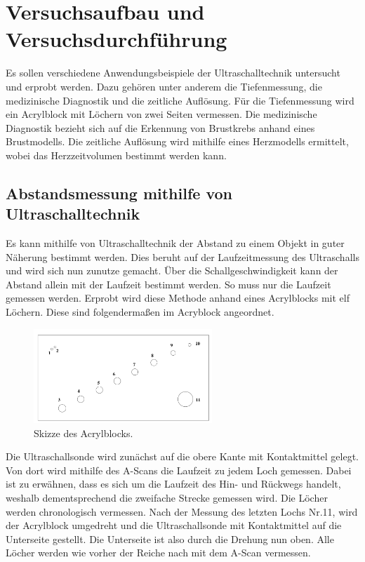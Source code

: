 


\section{Versuchsaufbau und Versuchsdurchführung}
\label{sec:Durchfuehrung}

Es sollen verschiedene Anwendungsbeispiele der Ultraschalltechnik untersucht und erprobt werden.
Dazu gehören unter anderem die Tiefenmessung, die medizinische Diagnostik und die zeitliche Auflösung.
Für die Tiefenmessung wird ein Acrylblock mit Löchern von zwei Seiten vermessen. Die medizinische 
Diagnostik bezieht sich auf die Erkennung von Brustkrebs anhand eines Brustmodells. Die zeitliche 
Auflösung wird mithilfe eines Herzmodells ermittelt, wobei das Herzzeitvolumen bestimmt werden kann.

\subsection{Abstandsmessung mithilfe von Ultraschalltechnik}
Es kann mithilfe von Ultraschalltechnik der Abstand zu einem Objekt in guter Näherung bestimmt werden. 
Dies beruht auf der Laufzeitmessung des Ultraschalls und wird sich nun zunutze gemacht. Über die 
Schallgeschwindigkeit kann der Abstand allein mit der Laufzeit bestimmt werden. So muss nur die 
Laufzeit gemessen werden. Erprobt wird diese Methode anhand eines Acrylblocks mit elf Löchern. Diese 
sind folgendermaßen im Acryblock angeordnet.

\begin{figure}[H]
    \centering
    \includegraphics[width=0.6\textwidth]{Acrylblock.png}
    \caption{Skizze des Acrylblocks.}
    \label{fig:Acryblock}
\end{figure}

\noindent Die Ultraschallsonde wird zunächst auf die obere Kante mit Kontaktmittel gelegt. Von dort wird mithilfe 
des A-Scans die Laufzeit zu jedem Loch gemessen. Dabei ist zu erwähnen, dass es sich um die Laufzeit 
des Hin- und Rückwegs handelt, weshalb dementsprechend die zweifache Strecke gemessen wird. Die Löcher werden 
chronologisch vermessen. Nach der Messung des letzten Lochs Nr.11, wird der Acrylblock umgedreht 
und die Ultraschallsonde mit Kontaktmittel auf die Unterseite gestellt. Die Unterseite ist also durch 
die Drehung nun oben. Alle Löcher werden wie vorher der Reiche nach mit dem A-Scan vermessen. \\

